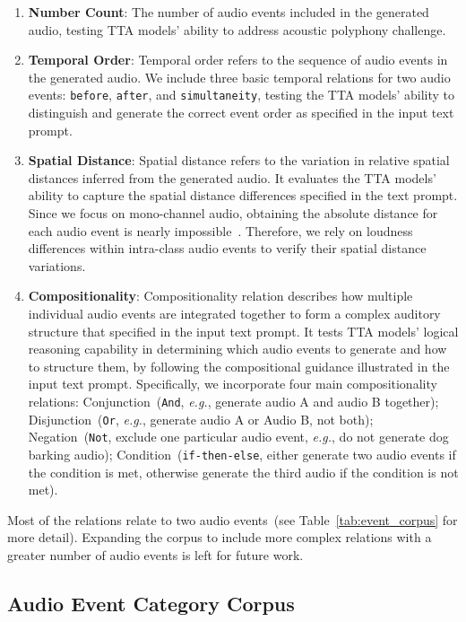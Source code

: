 \vspace{-2mm}
\begin{enumerate}[leftmargin=*]
    \item \textbf{Number Count}: The number of audio events included in the generated audio, testing TTA models' ability to address acoustic polyphony challenge.
    \item \textbf{Temporal Order}: Temporal order refers to the sequence of audio events in the generated audio. We include three basic temporal relations for two audio events: \texttt{before}, \texttt{after}, and \texttt{simultaneity}, testing the TTA models' ability to distinguish and generate the correct event order as specified in the input text prompt.
    \item \textbf{Spatial Distance}: Spatial distance refers to the variation in relative spatial distances inferred from the generated audio. It evaluates the TTA models' ability to capture the spatial distance differences specified in the text prompt. Since we focus on mono-channel audio, obtaining the absolute distance for each audio event is nearly impossible~\citep{sounddet}. Therefore, we rely on loudness differences within intra-class audio events to verify their spatial distance variations.
    \item \textbf{Compositionality}: Compositionality relation describes how multiple individual audio events are integrated together to form a complex auditory structure that specified in the input text prompt. It tests TTA models' logical reasoning capability in determining which audio events to generate and how to structure them, by following the compositional guidance illustrated in the input text prompt. Specifically, we incorporate four main compositionality relations: Conjunction~(\texttt{And}, \textit{e.g.}, generate audio A and audio B together); Disjunction~(\texttt{Or}, \textit{e.g.}, generate audio A or Audio B, not both); Negation~(\texttt{Not}, exclude one particular audio event, \textit{e.g.}, do not generate dog barking audio); Condition~(\texttt{if-then-else}, either generate two audio events if the condition is met, otherwise generate the third audio if the condition is not met). 
\end{enumerate}

Most of the relations relate to two audio events~(see Table~\ref{tab:event_corpus} for more detail). Expanding the corpus to include more complex relations with a greater number of audio events is left for future work.

\subsection{Audio Event Category Corpus}
\vspace{-2mm}
\label{sec:audio_event_category}

